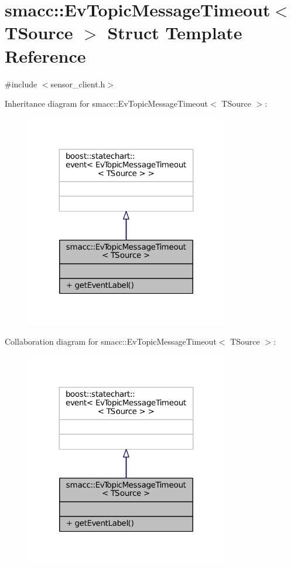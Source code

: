 \hypertarget{structsmacc_1_1EvTopicMessageTimeout}{}\section{smacc\+:\+:Ev\+Topic\+Message\+Timeout$<$ T\+Source $>$ Struct Template Reference}
\label{structsmacc_1_1EvTopicMessageTimeout}


{\ttfamily \#include $<$sensor\+\_\+client.\+h$>$}



Inheritance diagram for smacc\+:\+:Ev\+Topic\+Message\+Timeout$<$ T\+Source $>$\+:
\nopagebreak
\begin{figure}[H]
\begin{center}
\leavevmode
\includegraphics[width=251pt]{structsmacc_1_1EvTopicMessageTimeout__inherit__graph}
\end{center}
\end{figure}


Collaboration diagram for smacc\+:\+:Ev\+Topic\+Message\+Timeout$<$ T\+Source $>$\+:
\nopagebreak
\begin{figure}[H]
\begin{center}
\leavevmode
\includegraphics[width=251pt]{structsmacc_1_1EvTopicMessageTimeout__coll__graph}
\end{center}
\end{figure}
